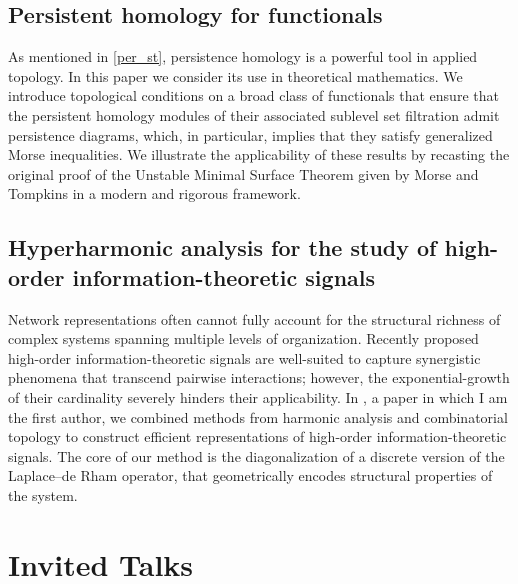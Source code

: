 \documentclass{amsart}
\begin{document}
\subsection{Persistent homology for functionals {\rm \cite{medina2022fuct_top}}} \label{func_top}

As mentioned in \cref{per_st}, persistence homology is a powerful tool in applied topology.
In this paper we consider its use in theoretical mathematics.
We introduce topological conditions on a broad class of functionals that ensure that the persistent homology modules of their associated sublevel set filtration admit persistence diagrams, which, in particular, implies that they satisfy generalized Morse inequalities. We illustrate the applicability of these results by recasting the original proof of the Unstable Minimal Surface Theorem given by Morse and Tompkins \cite{morse1939minimal} in a modern and rigorous framework.

\subsection{Hyperharmonic analysis for the study of high-order information-theoretic signals {\rm \cite{medina2021flowing}}} \label{hyper}

Network representations often cannot fully account for the structural richness of complex systems spanning multiple levels of organization.
Recently proposed high-order information-theoretic signals are well-suited to capture synergistic phenomena that transcend pairwise interactions; however, the exponential-growth of their cardinality severely hinders their applicability.
In \cite{medina2021hyperharmonic}, a paper in which I am the first author, we combined methods from harmonic analysis and combinatorial topology to construct efficient representations of high-order information-theoretic signals.
The core of our method is the diagonalization of a discrete version of the Laplace--de Rham operator, that geometrically encodes structural properties of the system.

\section*{Invited Talks}

\newcommand{\newTalk}[3]{\noindent#2 \hfill #3 \\}
\end{document}
